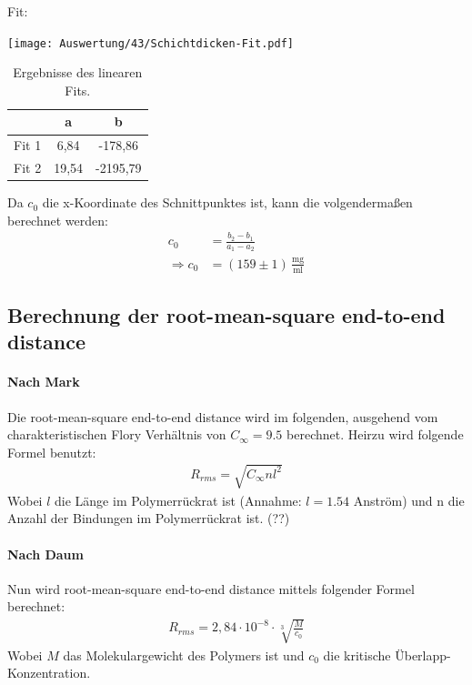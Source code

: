 Fit:
\begin{center}
	\captionsetup{type=figure}
	\texttt{[image: Auswertung/43/Schichtdicken-Fit.pdf]}
	\label{fig:fitgueteReflexion}
\end{center}

\begin{table}[h]
	\centering
	\begin{tabular}{r|c|c}
		& a & b \\ \hline
		Fit 1 & 6,84 & -178,86 \\
		Fit 2 & 19,54 & -2195,79
	\end{tabular}
	\caption[]{Ergebnisse des linearen Fits.}
\end{table}

Da $c_0$ die x-Koordinate des Schnittpunktes ist, kann die volgendermaßen berechnet werden:
\begin{align}
	c_0 &= \frac{b_2 - b_1}{a_1 - a_2}\\
	\Rightarrow c_0 &= (159 \pm 1) \, \frac{\text{mg}}{\text{ml}}
\end{align}

\subsection{Berechnung der root-mean-square end-to-end distance}

\paragraph*{Nach Mark}
Die root-mean-square end-to-end distance wird im folgenden, ausgehend vom charakteristischen Flory Verhältnis von $C_\infty = 9.5$ berechnet. Heirzu wird folgende Formel benutzt:
\begin{gather}
	R_{rms} = \sqrt{C_\infty n l^2}
\end{gather}
Wobei $l$ die Länge im Polymerrückrat ist (Annahme: $l = 1.54$ Anström) und n die Anzahl der Bindungen im Polymerrückrat ist. (??)

\paragraph*{Nach Daum}
Nun wird root-mean-square end-to-end distance mittels folgender Formel berechnet:
\begin{gather}
	R_{rms} = 2,84 \cdot 10^{-8} \cdot \sqrt[3]{\frac{M}{c_0}}
\end{gather}
Wobei $M$ das Molekulargewicht des Polymers ist und $c_0$ die kritische Überlapp-Konzentration.

